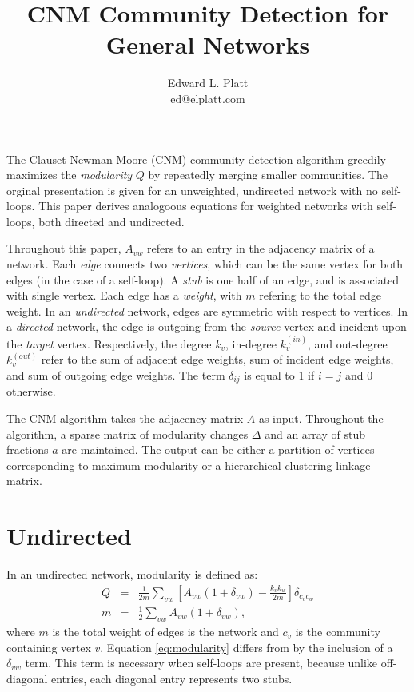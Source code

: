 \documentclass{article}
\title{CNM Community Detection for General Networks}
\author{Edward L. Platt\\ed@elplatt.com}
\newcommand{\beq}{\begin{eqnarray}}
\newcommand{\eeq}{\end{eqnarray}}
\begin{document}
\maketitle

The Clauset-Newman-Moore (CNM) community detection algorithm \cite{clauset_finding_2004}
greedily maximizes the {\em modularity} $Q$ by repeatedly merging smaller communities.
The orginal presentation is given for an unweighted, undirected network with no self-loops.
This paper derives analogoous equations for weighted networks with self-loops,
both directed and undirected.

Throughout this paper, $A_{vw}$ refers to an entry in the adjacency matrix of a network.
Each {\em edge} connects two {\em vertices},
which can be the same vertex for both edges (in the case of a self-loop).
A {\em stub} is one half of an edge, and is associated with single vertex.
Each edge has a {\em weight}, with $m$ refering to the total edge weight.
In an {\em undirected} network, edges are symmetric with respect to vertices.
In a {\em directed} network, the edge is outgoing from the {\em source} vertex
and incident upon the {\em target} vertex.
Respectively, the degree $k_v$, in-degree $k_v^{(in)}$, and out-degree $k_v^{(out)}$ refer to the
sum of adjacent edge weights, sum of incident edge weights, and sum of outgoing edge weights.
The term $\delta_{ij}$ is equal to 1 if $i = j$ and 0 otherwise.

The CNM algorithm takes the adjacency matrix $A$ as input. Throughout the algorithm,
a sparse matrix of modularity changes $\Delta$ and an array of stub fractions $a$
are maintained. The output can be either a partition of vertices corresponding to
maximum modularity or a hierarchical clustering linkage matrix.

\section{Undirected}
In an undirected network, modularity is defined as:
\beq
\label{eq:modularity} Q &=& \frac{1}{2m} \sum_{vw} \left[ A_{vw} (1 + \delta_{vw}) - \frac{k_v k_w}{2m} \right]\delta_{c_v c_w} \\
m &=& \frac{1}{2} \sum_{vw} A_{vw} (1 + \delta_{vw}),
\eeq
where $m$ is the total weight of edges is the network and $c_v$ is the community containing vertex $v$.
Equation \ref{eq:modularity} differs from \cite{clauset_finding_2004} by the inclusion of a $\delta_{vw}$ term.
This term is necessary when self-loops are present,
because unlike off-diagonal entries, each diagonal entry represents two stubs.
\end{document}

